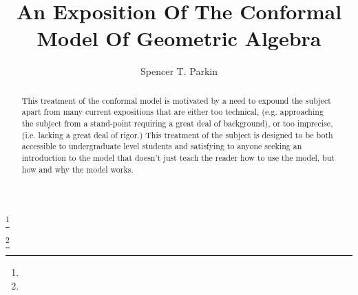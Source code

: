 \documentclass{amsbook}
\theoremstyle{definition}
\theoremstyle{remark}
\numberwithin{section}{chapter}
\numberwithin{equation}{chapter}
\begin{document}
\frontmatter

\title{An Exposition Of The Conformal Model Of Geometric Algebra}


\author{Spencer T. Parkin}
\address{}
\curraddr{}
\thanks{}

\author{}
\address{}
\curraddr{}
\email{}
\thanks{}



\date{}

\begin{abstract}
This treatment of the conformal model is motivated by a need to expound the subject
apart from many current expositions that are either too technical, (e.g. approaching the
subject from a stand-point requiring a great deal of background), or too imprecise, (i.e. lacking
a great deal of rigor.)  This treatment of the subject is designed to be both accessible
to undergraduate level students and satisfying to anyone seeking an introduction to the
model that doesn't just teach the reader how to use the model, but how and why the model works.
\end{abstract}

\maketitle


\setcounter{page}{5}

\tableofcontents



\mainmatter




\appendix


\backmatter



\printindex
\end{document}
